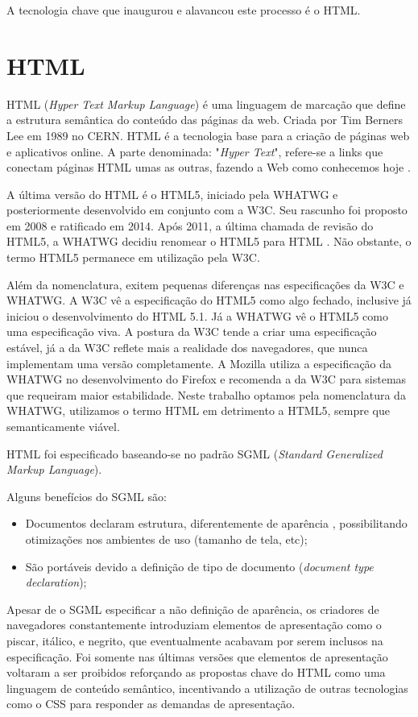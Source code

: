 A tecnologia chave que inaugurou e alavancou este processo é o HTML.
\section{HTML}

HTML (\textit{Hyper Text Markup Language}) é uma linguagem de
marcação que define a estrutura semântica do conteúdo das páginas
da web. Criada por Tim Berners Lee em 1989 no CERN. HTML é a tecnologia
base para a criação de páginas web e aplicativos online. A parte
denominada: "\textit{Hyper Text}", refere-se a links que conectam
páginas HTML umas as outras, fazendo a Web como conhecemos hoje
\autocite{mdn2015}.

A última versão do HTML é o HTML5, iniciado pela WHATWG e
posteriormente desenvolvido em conjunto com a W3C. Seu rascunho foi
proposto em 2008 e ratificado em 2014. Após 2011, a última chamada
de revisão do HTML5, a WHATWG decidiu renomear o HTML5 para HTML
\autocite{htmlIsTheNewHtml5}. Não obstante, o termo HTML5 permanece em
utilização pela W3C.

Além da nomenclatura, exitem pequenas diferenças nas especificações
da W3C e WHATWG. A W3C vê a especificação do HTML5 como algo fechado,
inclusive já iniciou o desenvolvimento do HTML 5.1. Já a WHATWG vê o
HTML5 como uma especificação viva. A postura da W3C tende a criar uma
especificação estável, já a da W3C reflete mais a realidade dos
navegadores, que nunca implementam uma versão completamente. A Mozilla
utiliza a especificação da WHATWG no desenvolvimento do Firefox e
recomenda a da W3C para sistemas que requeiram maior estabilidade. Neste
trabalho optamos pela nomenclatura da WHATWG, utilizamos o termo HTML em
detrimento a HTML5, sempre que semanticamente viável.

HTML foi especificado baseando-se no padrão SGML (\textit{Standard Generalized
Markup Language}).

Alguns benefícios do SGML são:
\begin{itemize}
    \item Documentos declaram estrutura, diferentemente de aparência
, possibilitando otimizações nos ambientes de uso (tamanho de tela,
etc);
    \item São portáveis devido a definição de tipo de documento
(\textit{document type declaration});
\end{itemize}

Apesar de o SGML especificar a não definição de aparência, os criadores de
navegadores constantemente introduziam elementos de apresentação como o
piscar, itálico, e negrito, que eventualmente acabavam por serem inclusos
na especificação. Foi somente nas últimas versões que elementos de
apresentação voltaram a ser proibidos reforçando as propostas chave
do HTML como uma linguagem de conteúdo semântico, incentivando a
utilização de outras tecnologias como o CSS para responder as demandas de
apresentação.

